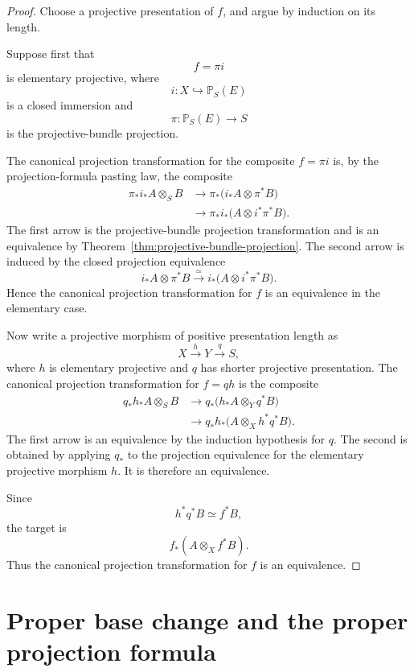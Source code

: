 \begin{proof}
Choose a projective presentation of \(f\), and argue by induction on its
length.

Suppose first that
\[
    f=\pi i
\]
is elementary projective, where
\[
    i:X\hookrightarrow\mathbb P_S(E)
\]
is a closed immersion and
\[
    \pi:\mathbb P_S(E)\longrightarrow S
\]
is the projective-bundle projection.

The canonical projection transformation for the composite \(f=\pi i\) is,
by the projection-formula pasting law, the composite
\[
\begin{aligned}
    \pi_*i_*A\otimes_SB
    &\longrightarrow
    \pi_*
    \bigl(
      i_*A\otimes\pi^*B
    \bigr) \\
    &\longrightarrow
    \pi_*i_*
    \bigl(
      A\otimes i^*\pi^*B
    \bigr).
\end{aligned}
\]
The first arrow is the projective-bundle projection transformation and is
an equivalence by
Theorem~\ref{thm:projective-bundle-projection}.
The second arrow is induced by the closed projection equivalence
\[
    i_*A\otimes\pi^*B
    \xrightarrow{\simeq}
    i_*
    \bigl(
      A\otimes i^*\pi^*B
    \bigr).
\]
Hence the canonical projection transformation for \(f\) is an equivalence
in the elementary case.

Now write a projective morphism of positive presentation length as
\[
    X\xrightarrow{h}Y\xrightarrow{q}S,
\]
where \(h\) is elementary projective and \(q\) has shorter projective
presentation.  The canonical projection transformation for \(f=qh\) is the
composite
\[
\begin{aligned}
    q_*h_*A\otimes_SB
    &\longrightarrow
    q_*
    \bigl(
      h_*A\otimes_Yq^*B
    \bigr) \\
    &\longrightarrow
    q_*h_*
    \bigl(
      A\otimes_Xh^*q^*B
    \bigr).
\end{aligned}
\]
The first arrow is an equivalence by the induction hypothesis for \(q\).
The second is obtained by applying \(q_*\) to the projection equivalence for
the elementary projective morphism \(h\).  It is therefore an equivalence.

Since
\[
    h^*q^*B
    \simeq
    f^*B,
\]
the target is
\[
    f_*(A\otimes_Xf^*B).
\]
Thus the canonical projection transformation for \(f\) is an equivalence.
\end{proof}

\section{Proper base change and the proper projection formula}
\label{sec:proper-exchange}

